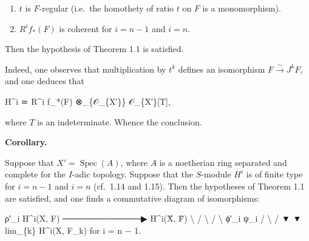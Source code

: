 \documentclass[
  11pt,
  a4paper,
]{book}
\newenvironment{Shaded}{}{}
\newcommand{\NormalTok}[1]{#1}
\begin{document}
\begin{enumerate}
\def\labelenumi{(\roman{enumi})}
\item
  \(t\) is \(F\)-regular (i.e.~the homothety of ratio \(t\) on \(F\) is
  a monomorphism).
\item
  \(R^{i} f_{*}(F)\) is coherent for \(i = n - 1\) and \(i = n\).
\end{enumerate}

Then the hypothesis of Theorem 1.1 is satisfied.

Indeed, one observes that multiplication by \(t^{k}\) defines an
isomorphism \(F \xrightarrow{\sim} J^{k} F\), and one deduces that

\begin{Shaded}
\begin{Highlighting}[]
\NormalTok{H\^{}i ≃ R\^{}i f\_*(F) ⊗\_\{𝒪\_\{X′\}\} 𝒪\_\{X′\}[T],}
\end{Highlighting}
\end{Shaded}

where \(T\) is an indeterminate. Whence the conclusion.

\textbf{Corollary.}

Suppose that \(X' = \operatorname{Spec}(A)\), where \(A\) is a
noetherian ring separated and complete for the \(I\)-adic topology.
Suppose that the \(S\)-module \(H^{i}\) is of finite type for
\(i = n - 1\) and \(i = n\) (cf.~1.14 and 1.15). Then the hypotheses of
Theorem 1.1 are satisfied, and one finds a commutative diagram of
isomorphisms:

\begin{Shaded}
\begin{Highlighting}[]
\NormalTok{                    ρ′\_i}
\NormalTok{   H\^{}i(X, F)  ─────────────▶  H\^{}i(X̂, F̂)}
\NormalTok{         \textbackslash{}                      /}
\NormalTok{          \textbackslash{}                    /}
\NormalTok{           \textbackslash{} ϕ′\_i         ψ\_i /}
\NormalTok{            \textbackslash{}                /}
\NormalTok{             ▼              ▼}
\NormalTok{              lim\_\{k\} H\^{}i(X, F\_k)              for i = n − 1.}
\end{Highlighting}
\end{Shaded}
\end{document}
